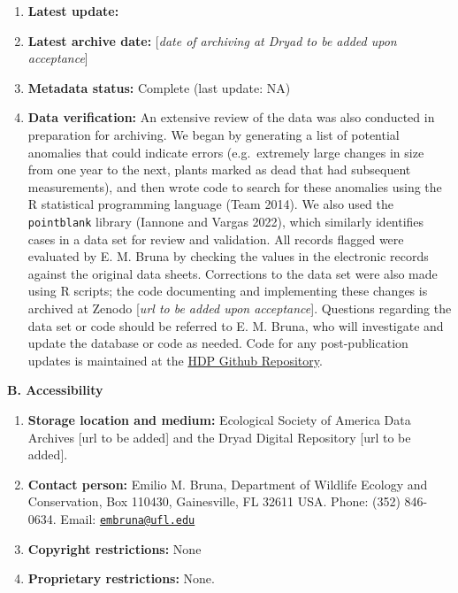 \documentclass[
  12pt,
  man, donotrepeattitle,floatsintext]{apa6}
\begin{document}
\begin{enumerate}
\def\labelenumi{\arabic{enumi}.}
\item
  \textbf{Latest update:}
\item
  \textbf{Latest archive date:} {[}\emph{date of archiving at Dryad to be added upon acceptance}{]}
\item
  \textbf{Metadata status:} Complete (last update:
  NA)
\item
  \textbf{Data verification:} An extensive review of the data was also conducted in preparation for archiving. We began by generating a list of potential anomalies that could indicate errors (e.g.~extremely large changes in size from one year to the next, plants marked as dead that had subsequent measurements), and then wrote code to search for these anomalies using the R statistical programming language (Team 2014). We also used the \texttt{pointblank} library (Iannone and Vargas 2022), which similarly identifies cases in a data set for review and validation. All records flagged were evaluated by E. M. Bruna by checking the values in the electronic records against the original data sheets. Corrections to the data set were also made using R scripts; the code documenting and implementing these changes is archived at Zenodo {[}\emph{url to be added upon acceptance}{]}. Questions regarding the data set or code should be referred to E. M. Bruna, who will investigate and update the database or code as needed. Code for any post-publication updates is maintained at the \href{https://github.com/BrunaLab/HeliconiaSurveys}{HDP Github Repository}.
\end{enumerate}

\noindent 
\textbf{B. Accessibility}

\begin{enumerate}
\def\labelenumi{\arabic{enumi}.}
\item
  \textbf{Storage location and medium:} Ecological Society of America Data Archives {[}url to be added{]} and the Dryad Digital Repository {[}url to be added{]}.
\item
  \textbf{Contact person:} Emilio M. Bruna, Department of Wildlife Ecology and Conservation, Box 110430, Gainesville, FL 32611 USA. Phone: (352) 846-0634. Email: \href{mailto:embruna@ufl.edu}{\nolinkurl{embruna@ufl.edu}}
\item
  \textbf{Copyright restrictions:} None
\item
  \textbf{Proprietary restrictions:} None.
\end{enumerate}
\end{document}
